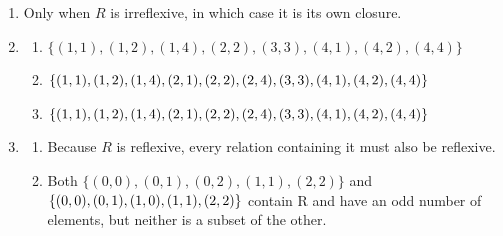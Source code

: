 \documentclass{sig-alternate-05-2015}
\begin{document}
\begin{enumerate}
\item Only when $R$ is irreflexive, in which case it is its own closure.

\item
	\begin{enumerate}
		\item $\{(1, 1), (1, 2),
			(1, 4), (2, 2), (3, 3), (4, 1), (4, 2), (4, 4)\}$
		\item $\{(1, 1),(1, 2), (1, 4), (2, 1), (2, 2), (2, 4),\\ (3, 3), (4, 1), (4, 2),
			(4, 4)\}$
		\item $\{(1, 1), (1, 2), (1, 4), (2, 1), (2, 2), (2, 4),\\ (3, 3),
			(4, 1), (4, 2), (4, 4)\}$
	\end{enumerate}

\item 
	\begin{enumerate}
		\item Because $R$ is reflexive, every
		relation containing it must also be reflexive.
		\item Both $\{(0, 0),
			(0, 1), (0, 2), (1, 1), (2, 2)\}$ and $\{(0, 0),\\ (0, 1), (1, 0), (1, 1),
			(2, 2)\}$ contain R and have an odd number of elements, but
		neither is a subset of the other.
	\end{enumerate}
\end{enumerate}
\end{document}
